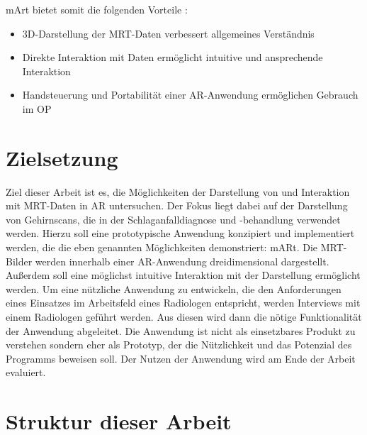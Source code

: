 mArt bietet somit die folgenden Vorteile :

\begin{itemize}
\item 3D-Darstellung der MRT-Daten verbessert allgemeines Verständnis 
\item Direkte Interaktion mit Daten ermöglicht intuitive und ansprechende Interaktion
\item Handsteuerung und Portabilität einer AR-Anwendung ermöglichen Gebrauch im OP
\end{itemize}


\section{Zielsetzung}

Ziel dieser Arbeit ist es, die Möglichkeiten der Darstellung von und Interaktion mit MRT-Daten in AR untersuchen. Der Fokus liegt dabei auf der Darstellung von Gehirnscans, die in der Schlaganfalldiagnose und -behandlung verwendet werden.
Hierzu soll eine prototypische Anwendung konzipiert und implementiert werden, die die eben genannten Möglichkeiten demonstriert: mARt.
Die MRT-Bilder werden innerhalb einer AR-Anwendung dreidimensional dargestellt. Außerdem soll eine möglichst intuitive Interaktion mit der Darstellung ermöglicht werden. 
Um eine nützliche Anwendung zu entwickeln, die den Anforderungen eines Einsatzes im Arbeitsfeld eines Radiologen entspricht, werden Interviews mit einem Radiologen geführt werden. Aus diesen wird dann die nötige Funktionalität der Anwendung abgeleitet. 
Die Anwendung ist nicht als einsetzbares Produkt zu verstehen sondern eher als Prototyp, der die Nützlichkeit und das Potenzial des Programms beweisen soll. Der Nutzen der Anwendung wird am Ende der Arbeit evaluiert.


\section{Struktur dieser Arbeit}

